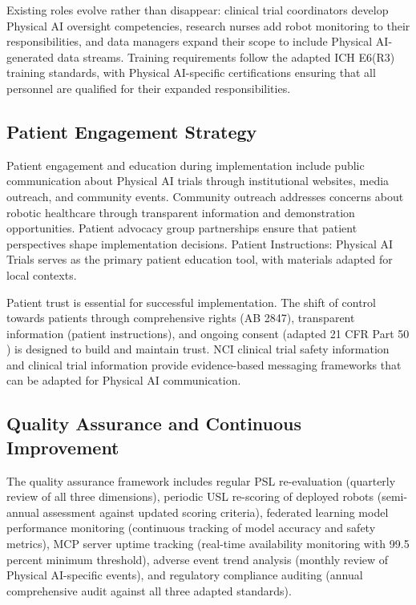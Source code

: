 Existing roles evolve rather than disappear: clinical trial coordinators
develop Physical AI oversight competencies, research nurses add robot
monitoring to their responsibilities, and data managers expand their scope to
include Physical AI-generated data streams. Training requirements follow the
adapted ICH E6(R3) \cite{ich-adapt} training standards, with Physical AI-specific
certifications ensuring that all personnel are qualified for their expanded
responsibilities.

\subsection{Patient Engagement Strategy}
\label{subsec:impl-patient}

Patient engagement and education during implementation include public
communication about Physical AI trials through institutional websites, media
outreach, and community events. Community outreach addresses concerns about
robotic healthcare through transparent information and demonstration
opportunities. Patient advocacy group partnerships ensure that patient
perspectives shape implementation decisions. Patient Instructions: Physical AI
Trials \cite{patient-instructions-paper} serves as the primary patient
education tool, with materials adapted for local contexts.

Patient trust is essential for successful implementation. The shift of control
towards patients through comprehensive rights (AB 2847), transparent
information (patient instructions), and ongoing consent (adapted 21 CFR Part 50
\cite{cfr50-adapt}) is designed to build and maintain trust. NCI clinical trial
safety information \cite{nci-trials-safety} and clinical trial information
\cite{nci-clinical-trials} provide evidence-based messaging frameworks that can
be adapted for Physical AI communication.

\subsection{Quality Assurance and Continuous Improvement}
\label{subsec:impl-quality}

The quality assurance framework includes regular PSL re-evaluation (quarterly
review of all three dimensions), periodic USL re-scoring of deployed robots
(semi-annual assessment against updated scoring criteria), federated learning
model performance monitoring (continuous tracking of model accuracy and safety
metrics), MCP server uptime tracking (real-time availability monitoring with
99.5 percent minimum threshold), adverse event trend analysis (monthly review
of Physical AI-specific events), and regulatory compliance auditing (annual
comprehensive audit against all three adapted standards).

